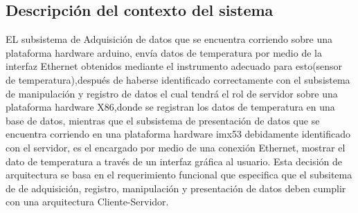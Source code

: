 \subsection{\textcolor[gray]{.2}{Descripción del contexto del sistema}}

EL subsistema de Adquisición  de datos que se encuentra corriendo sobre una plataforma hardware arduino, envía datos de temperatura por medio de la interfaz Ethernet obtenidos mediante el instrumento adecuado para esto(sensor de temperatura),después de haberse identificado correctamente con el subsistema de manipulación y registro de datos el cual tendrá el rol de servidor sobre una plataforma hardware X86,donde se registran los datos de temperatura en una base de datos, mientras que el subsistema de presentación de datos que se encuentra corriendo en una plataforma hardware imx53 debidamente identificado con el servidor, es el encargado por medio de una conexión Ethernet, mostrar el dato de temperatura a través de un interfaz gráfica al usuario. 
Esta decisión de arquitectura se basa en el requerimiento funcional que especifica que el subsitema de de adquisición, registro, manipulación y presentación de datos  deben cumplir con una arquitectura Cliente-Servidor. 

\newpage

